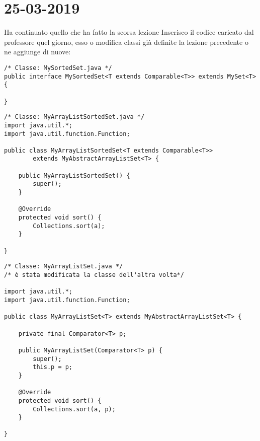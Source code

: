 

\newpage
\section{25-03-2019}
\noindent Ha continuato quello che ha fatto la scorsa lezione \newline
Inserisco il codice caricato dal professore quel giorno, esso o modifica classi già definite la lezione precedente o ne aggiunge di nuove: 

\begin{lstlisting}[basicstyle=\small,]
/* Classe: MySortedSet.java */
public interface MySortedSet<T extends Comparable<T>> extends MySet<T> {

}
\end{lstlisting}

\begin{lstlisting}[basicstyle=\small,]
/* Classe: MyArrayListSortedSet.java */
import java.util.*;
import java.util.function.Function;

public class MyArrayListSortedSet<T extends Comparable<T>>
        extends MyAbstractArrayListSet<T> {

    public MyArrayListSortedSet() {
        super();
    }

    @Override
    protected void sort() {
        Collections.sort(a);
    }

}
\end{lstlisting}

\begin{lstlisting}[basicstyle=\small,]
/* Classe: MyArrayListSet.java */
/* è stata modificata la classe dell'altra volta*/

import java.util.*;
import java.util.function.Function;

public class MyArrayListSet<T> extends MyAbstractArrayListSet<T> {

    private final Comparator<T> p;

    public MyArrayListSet(Comparator<T> p) {
        super();
        this.p = p;
    }

    @Override
    protected void sort() {
        Collections.sort(a, p);
    }

}

\end{lstlisting}

